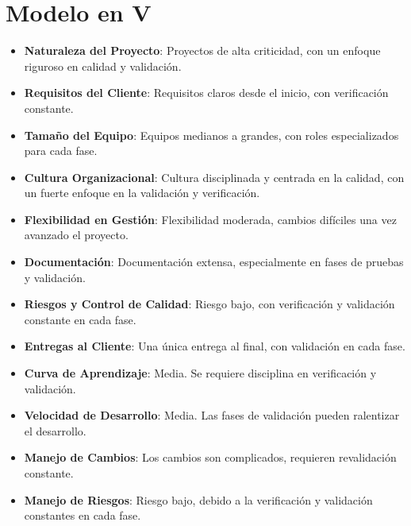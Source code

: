 \documentclass[main.tex]{subfiles}
\begin{document}
\section{Modelo en V}
\begin{itemize}
    \item \textbf{Naturaleza del Proyecto}: Proyectos de alta criticidad, con un enfoque riguroso en calidad y validación.
    \item \textbf{Requisitos del Cliente}: Requisitos claros desde el inicio, con verificación constante.
    \item \textbf{Tamaño del Equipo}: Equipos medianos a grandes, con roles especializados para cada fase.
    \item \textbf{Cultura Organizacional}: Cultura disciplinada y centrada en la calidad, con un fuerte enfoque en la validación y verificación.
    \item \textbf{Flexibilidad en Gestión}: Flexibilidad moderada, cambios difíciles una vez avanzado el proyecto.
    \item \textbf{Documentación}: Documentación extensa, especialmente en fases de pruebas y validación.
    \item \textbf{Riesgos y Control de Calidad}: Riesgo bajo, con verificación y validación constante en cada fase.
    \item \textbf{Entregas al Cliente}: Una única entrega al final, con validación en cada fase.
    \item \textbf{Curva de Aprendizaje}: Media. Se requiere disciplina en verificación y validación.
    \item \textbf{Velocidad de Desarrollo}: Media. Las fases de validación pueden ralentizar el desarrollo.
    \item \textbf{Manejo de Cambios}: Los cambios son complicados, requieren revalidación constante.
    \item \textbf{Manejo de Riesgos}: Riesgo bajo, debido a la verificación y validación constantes en cada fase.
\end{itemize}
\end{document}
